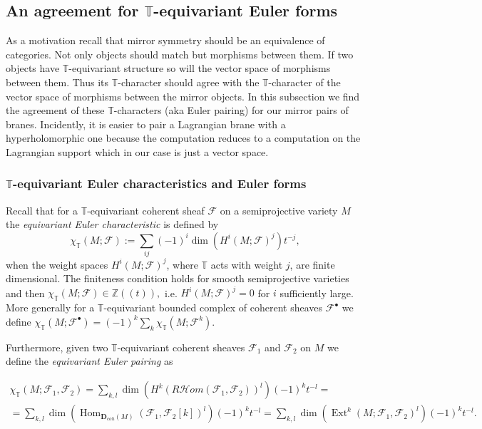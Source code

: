 \documentclass[12pt]{article}
\numberwithin{equation}{section}
\theoremstyle{remark}
\theoremstyle{definition}
\numberwithin{theorem}{section}
\DeclareMathOperator{\Hom}{Hom}
\DeclareMathOperator{\Ext}{Ext }
\def\calF{{\mathcal{F}}}
\newcommand{\T}{{\mathbb{T}}}
\def\Z{\mathbb{Z}}
\renewcommand{\1}{\mathbbm{1}}
\begin{document}

\subsection{An agreement for $\T$-equivariant Euler forms} 

As a motivation recall that mirror symmetry should be an equivalence of categories. Not only objects should match but morphisms between them. If two objects have $\T$-equivariant structure so will the vector space of morphisms between them. Thus its $\T$-character should agree with the $\T$-character of the vector space of morphisms between the mirror objects. In this subsection we find the agreement of these $\T$-characters (aka Euler pairing) for our mirror pairs of branes. Incidently, it is easier to pair a Lagrangian brane with a hyperholomorphic one because the computation reduces to a computation on the Lagrangian support which in our case is just a vector space. 


\subsubsection{$\T$-equivariant Euler characteristics and Euler forms}
\label{equivarianteuler}
Recall that for a $\T$-equivariant coherent sheaf $\calF$ on a semiprojective variety $M$ the {\em equivariant Euler characteristic} is defined by
$$\chi_\T(M;\calF):=\sum_{ij} (-1)^i \dim(H^i(M;\calF)^{j}) t^{-j},$$ 
when the weight spaces $H^i(M;\calF)^{j}$, where $\T$ acts with weight $j$, are finite dimensional. The finiteness condition holds for smooth semiprojective varieties and  then $\chi_\T(M;\calF)\in \Z((t)),$ i.e.  $H^i(M;\calF)^j=0$ for $i$ sufficiently large. More generally for a $\T$-equivariant bounded complex of coherent sheaves $\calF^\bullet$ we define $\chi_\T(M;\calF^\bullet)=(-1)^k\sum_k \chi_\T(M;\calF^k)$. 

Furthermore, given two $\T$-equivariant coherent sheaves $\calF_1$ and $\calF_2$ on $M$ we define the {\em equivariant Euler pairing} as

\begin{multline*}\chi_\T(M;\calF_1,\calF_2)=\sum_{k,l} \dim(H^k({ R} {\mathcal Hom}(\calF_1,\calF_2))^l) (-1)^k t^{-l}=\\ =\sum_{k,l} \dim\left(\Hom_{{\mathbf D}_{coh}(M)}(\calF_1,\calF_2[k])^l\right) (-1)^k t^{-l}=\sum_{k,l} \dim(\Ext^k(M;\calF_1,\calF_2)^l) (-1)^k t^{-l} .\end{multline*}
\end{document}
